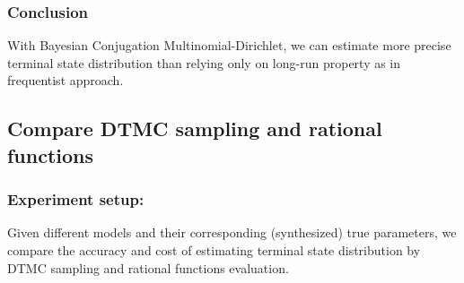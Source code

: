 \documentclass[12pt]{article}
\theoremstyle{definition}
\begin{document}
\subsubsection{Conclusion}
With Bayesian Conjugation Multinomial-Dirichlet, we can estimate more precise
terminal state distribution than relying only on long-run property as in
frequentist approach.

\subsection{Compare DTMC sampling and rational functions}
\subsubsection{Experiment setup:}
Given different models and their corresponding (synthesized) true parameters, we
compare the accuracy and cost of estimating terminal state distribution by DTMC
sampling and rational functions evaluation.
\end{document}

